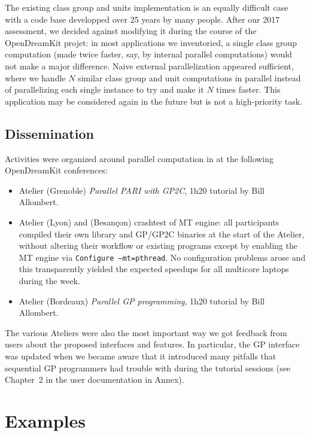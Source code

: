 \documentclass{deliverablereport}
\begin{document}
The existing class group and units implementation is an equally difficult
case with a code base developped over 25 years by many people. After our 2017
assessment, we decided against modifying it during the course of the
OpenDreamKit projet: in most applications we inventoried, a single class
group computation (made twice faster, say, by internal parallel
computations) would not make a major difference. Naive external
parallelization appeared sufficient, where we handle $N$ similar class group 
and unit computations in parallel instead of parallelizing each single
instance to try and make it $N$ times faster. This application may be
considered again in the future but is not a high-priority task.

\subsection{Dissemination}

Activities were organized around parallel computation in \PariGP
at the following OpenDreamKit conferences:
\begin{itemize}
  \item Atelier  (Grenoble) \emph{Parallel PARI with GP2C},
  1h20 tutorial by Bill Allombert.
  \item Atelier  (Lyon) and  (Besançon)
  crashtest of MT engine: all participants compiled their own \Pari library and
  GP/GP2C  binaries at the start of the Atelier, without altering their
  workflow or existing programs except by enabling the MT engine via
  \texttt{Configure --mt=pthread}. No configuration problems arose and this
  transparently yielded the expected speedups for all multicore laptops during
  the week.

  \item Atelier  (Bordeaux) \emph{Parallel GP programming},
  1h20 tutorial by Bill Allombert.
\end{itemize}
The various Ateliers were also the most important way we got feedback from
users about the proposed interfaces and features. In particular, the GP
interface was updated when we became aware that it introduced many pitfalls
that sequential GP programmers had trouble with during the tutorial
sessions (see Chapter~2 in the user documentation in Annex).

\section{Examples}
\end{document}
